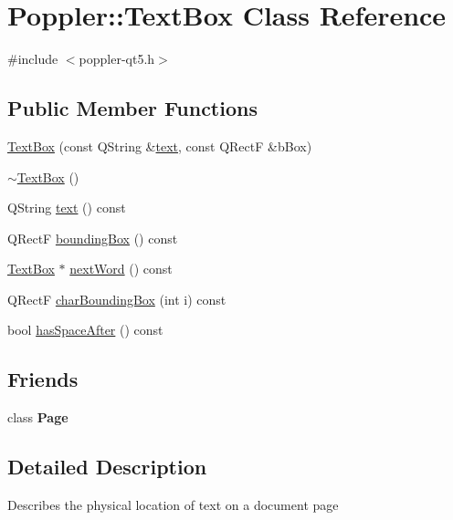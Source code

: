 \hypertarget{class_poppler_1_1_text_box}{}\section{Poppler\+:\+:Text\+Box Class Reference}
\label{class_poppler_1_1_text_box}


{\ttfamily \#include $<$poppler-\/qt5.\+h$>$}

\subsection*{Public Member Functions}
\begin{DoxyCompactItemize}
\item 
\hyperlink{class_poppler_1_1_text_box_a30ecac65b16336a142f6e22a11deba16}{Text\+Box} (const Q\+String \&\hyperlink{class_poppler_1_1_text_box_a80d723ab49d7a4f4d0537d0634984cfd}{text}, const Q\+RectF \&b\+Box)
\item 
\hyperlink{class_poppler_1_1_text_box_ab7c26a4f5846bd476aca0407178c5b52}{$\sim$\+Text\+Box} ()
\item 
Q\+String \hyperlink{class_poppler_1_1_text_box_a80d723ab49d7a4f4d0537d0634984cfd}{text} () const
\item 
Q\+RectF \hyperlink{class_poppler_1_1_text_box_aec5e4bb53dc611ab6ee5d7e23f7fc428}{bounding\+Box} () const
\item 
\hyperlink{class_poppler_1_1_text_box}{Text\+Box} $\ast$ \hyperlink{class_poppler_1_1_text_box_aec2e7151db7890883cccb9a4a7106bd1}{next\+Word} () const
\item 
Q\+RectF \hyperlink{class_poppler_1_1_text_box_aebaf1758240244c08d75dba3d0229f83}{char\+Bounding\+Box} (int i) const
\item 
bool \hyperlink{class_poppler_1_1_text_box_a2c5f5c29a805dabe1cfd90bbd1eb0e11}{has\+Space\+After} () const
\end{DoxyCompactItemize}
\subsection*{Friends}
\begin{DoxyCompactItemize}
\item 
\mbox{\label{class_poppler_1_1_text_box_a66d145c56e1747e0aecb5309042ab183}} 
class {\bfseries Page}
\end{DoxyCompactItemize}


\subsection{Detailed Description}
Describes the physical location of text on a document page


